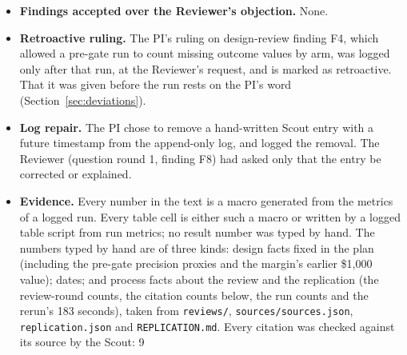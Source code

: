 \begin{itemize}
        review round was held, although the crew's playbook calls for one before the design
        gate. Its independence level was \emph{fresh-context}: a new context in every
        round, with the same model family as the other roles. The human author chose this
        over a cross-family reviewer. The code review took place after the analysis runs,
        because the study's plan predates the crew's rule that code is reviewed before any
        analysis run (see Section~\ref{sec:deviations}); it passed with four minor findings.
        These were answered in the files and judged answered in the second results round,
        but they are still marked open in the code-review record. The final question round
        and the final results round each passed with two minor findings still open; the
        human approved those gates, and the open findings were then addressed (by the
        design, and by the figures and the approximation wording, respectively).
  \item \textbf{Findings accepted over the Reviewer's objection.} None.
  \item \textbf{Retroactive ruling.} The PI's ruling on design-review finding F4, which
        allowed a pre-gate run to count missing outcome values by arm, was logged only
        after that run, at the Reviewer's request, and is marked as retroactive. That it was
        given before the run rests on the PI's word (Section~\ref{sec:deviations}).
  \item \textbf{Log repair.} The PI chose to remove a hand-written Scout entry with a
        future timestamp from the append-only log, and logged the removal. The Reviewer
        (question round 1, finding F8) had asked only that the entry be corrected or
        explained.
  \item \textbf{Evidence.} Every number in the text is a macro generated from the metrics
        of a logged run. Every table cell is either such a macro or written by a logged
        table script from run metrics; no result number was typed by hand. The numbers typed
        by hand are of three kinds: design facts fixed in the plan (including the pre-gate
        precision proxies and the margin's earlier \$1,000 value); dates; and process facts
        about the review and the replication (the review-round counts, the citation counts
        below, the run counts and the rerun's 183 seconds), taken from \texttt{reviews/},
        \texttt{sources/sources.json}, \texttt{replication.json} and
        \texttt{REPLICATION.md}. Every citation was checked against its source by the Scout: 9

\end{itemize}
